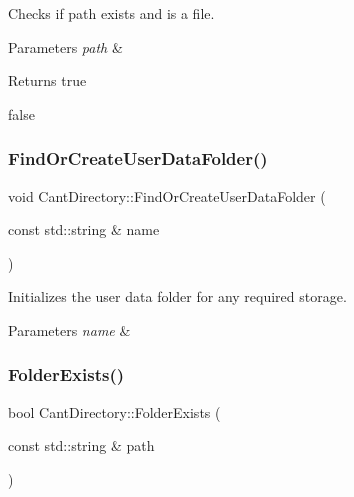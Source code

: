 Checks if path exists and is a file. 


\begin{DoxyParams}{Parameters}
{\em path} & \\
\hline
\end{DoxyParams}
\begin{DoxyReturn}{Returns}
true 

false 
\end{DoxyReturn}
\mbox{\label{namespaceCantDirectory_ab1cf2a41c7f33a747d65f2c200724e61}} 
\subsubsection{\texorpdfstring{Find\+Or\+Create\+User\+Data\+Folder()}{FindOrCreateUserDataFolder()}}
{\footnotesize\ttfamily void Cant\+Directory\+::\+Find\+Or\+Create\+User\+Data\+Folder (\begin{DoxyParamCaption}\item[{const std\+::string \&}]{name }\end{DoxyParamCaption})}



Initializes the user data folder for any required storage. 


\begin{DoxyParams}{Parameters}
{\em name} & \\
\hline
\end{DoxyParams}
\mbox{\label{namespaceCantDirectory_a3fc8037d0d488b6ebd001aae47b474a8}} 
\subsubsection{\texorpdfstring{Folder\+Exists()}{FolderExists()}}
{\footnotesize\ttfamily bool Cant\+Directory\+::\+Folder\+Exists (\begin{DoxyParamCaption}\item[{const std\+::string \&}]{path }\end{DoxyParamCaption})}



